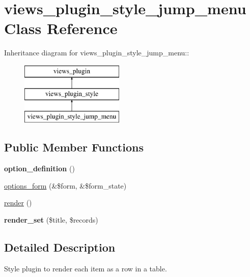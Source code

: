 \hypertarget{classviews__plugin__style__jump__menu}{
\section{views\_\-plugin\_\-style\_\-jump\_\-menu Class Reference}
\label{classviews__plugin__style__jump__menu}
}
Inheritance diagram for views\_\-plugin\_\-style\_\-jump\_\-menu::\begin{figure}[H]
\begin{center}
\leavevmode
\includegraphics[height=3cm]{classviews__plugin__style__jump__menu}
\end{center}
\end{figure}
\subsection*{Public Member Functions}
\begin{DoxyCompactItemize}
\item 
\hypertarget{classviews__plugin__style__jump__menu_a6e27e595ed6a3115705f13b76367b637}{
{\bfseries option\_\-definition} ()}
\label{classviews__plugin__style__jump__menu_a6e27e595ed6a3115705f13b76367b637}

\item 
\hyperlink{classviews__plugin__style__jump__menu_ad7158f1d70c97809b44bfa0e10b11709}{options\_\-form} (\&\$form, \&\$form\_\-state)
\item 
\hyperlink{classviews__plugin__style__jump__menu_aebc54d57acea582a05435beccaa26fef}{render} ()
\item 
\hypertarget{classviews__plugin__style__jump__menu_a93441f167ef28ec39b09930713878d4a}{
{\bfseries render\_\-set} (\$title, \$records)}
\label{classviews__plugin__style__jump__menu_a93441f167ef28ec39b09930713878d4a}

\end{DoxyCompactItemize}


\subsection{Detailed Description}
Style plugin to render each item as a row in a table. 

